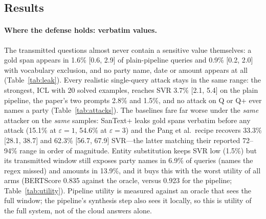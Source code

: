 \subsection{Results}
\label{sec:adaptive:results}



\paragraph{Where the defense holds: verbatim values.} The transmitted questions almost never contain a sensitive value themselves: a gold span appears in 1.6\% [0.6, 2.9] of plain-pipeline queries and 0.9\% [0.2, 2.0] with vocabulary exclusion, and no party name, date or amount appears at all (Table~\ref{tab:leak}). Every realistic single-query attack stays in the same range: the strongest, ICL with 20 solved examples, reaches SVR 3.7\% [2.1, 5.4] on the plain pipeline, the paper's two prompts 2.8\% and 1.5\%, and no attack on Q or Q+ ever names a party (Table~\ref{tab:attacks}). The baselines fare far worse under the \emph{same} attacker on the \emph{same} samples: SanText+ leaks gold spans verbatim before any attack (15.1\% at $\varepsilon{=}1$, 54.6\% at $\varepsilon{=}3$) and the Pang et al.\ recipe recovers 33.3\% [28.1, 38.7] and 62.3\% [56.7, 67.9] SVR---the latter matching their reported 72--94\% range in order of magnitude. Entity substitution keeps SVR low (1.5\%) but its transmitted window still exposes party names in 6.9\% of queries (names the regex missed) and amounts in 13.9\%, and it buys this with the worst utility of all arms (BERTScore 0.835 against the oracle, versus 0.923 for the pipeline; Table~\ref{tab:utility}). Pipeline utility is measured against an oracle that sees the full window; the pipeline's synthesis step also sees it locally, so this is utility of the full system, not of the cloud answers alone.


